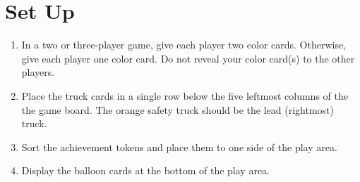 \documentclass[a6paper, 11pt, parskip=half, DIV=15]{scrartcl}
\begin{document}
\newpage
\enlargethispage{1.75\baselineskip}
\section*{Set Up}
\begin{enumerate}

  \item In a two or three-player game, give each player two color cards. Otherwise, give each player one color card.
  Do not reveal your color card(s) to the other players.

 
  \item Place the truck cards in a single row below the five leftmost columns of the the game board. The orange safety truck should be the lead (rightmost) truck.%

	
  \item Sort the achievement tokens and place them to one side of the play area.

  \item Display the balloon cards at the bottom of the play area. 

\end{enumerate}
\end{document}
